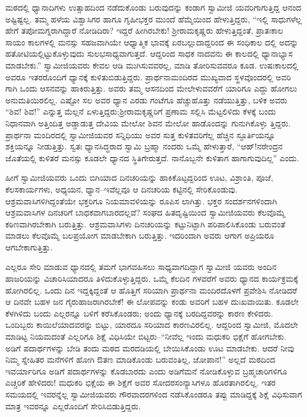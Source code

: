 ಮಠದಲ್ಲಿ ಧ್ಯಾನಾದಿಗಳು ಉತ್ಸಾಹದಿಂದ ನಡೆದುಕೊಂಡು ಬರುವುದನ್ನು ಕಂಡಾಗ ಸ್ವಾಮೀಜಿ ಯವರಿಗಾಗುತ್ತಿದ್ದ ಆನಂದ ಅಷ್ಟಿಷ್ಟಲ್ಲ. ತಮ್ಮ ಹಳೆಯ ವಿಶ್ವಾಸಿಗರ ಹಾಗೂ ಗೃಹೀಭಕ್ತರ ಮುಂದೆ ಹೆಮ್ಮೆಯಿಂದ ಹೇಳುತ್ತಿದ್ದರು, “ಇಲ್ಲಿ ಸಾಧುಗಳೆಲ್ಲ ಹೇಗೆ ತಪೋಮಗ್ನರಾಗಿದ್ದಾರೆ ನೋಡಿದಿರಾ? ಇದ್ದರೆ ಹೀಗಿರಬೇಕು! ಶ್ರೀರಾಮಕೃಷ್ಣರು ಹೇಳುತ್ತಿದ್ದಂತೆ, ಪ್ರಾತಃಕಾಲ ಸಾಯಂ ಕಾಲಗಳಲ್ಲಿ ಮನಸ್ಸು ಸಹಜವಾಗಿಯೇ ಆಧ್ಯಾತ್ಮಿಕ ಭಾವಕ್ಕೆ ಏರಬಲ್ಲುದಾದ್ದರಿಂದ ಈ ಸಂಧಿಕಾಲ ದಲ್ಲಿ ಅದನ್ನು ಹತೋಟಿಯಲ್ಲಿಟ್ಟುಕೊಳ್ಳುವುದು ಸುಲಭಸಾಧ್ಯವಾಗುತ್ತದೆ. ಆದ್ದರಿಂದ ಸಾಧಕ ನಾದವನು ಈ ಕಾಲದಲ್ಲಿ ಧ್ಯಾನಾಭ್ಯಾಸ ಮಾಡಬೇಕು.” ಸ್ವಾಮೀಜಿಯವರು ಕೇವಲ ಆಡಿ ಮುಗಿಸುವವರಲ್ಲ, ಮಾಡಿ ತೋರಿಸುವವರೂ ಕೂಡ. ಉಷಃಕಾಲದಲ್ಲಿ ಅವರೂ ಇತರರೊಂದಿಗೆ ಧ್ಯಾನಕ್ಕೆ ಕುಳಿತುಬಿಡುತ್ತಿದ್ದರು. ಪ್ರಾರ್ಥನಾಮಂದಿರದ ಮುಖ್ಯವಾದ ಸ್ಥಳವೊಂದರಲ್ಲಿ ಅವರಿ ಗಾಗಿ ಒಂದು ಆಸನವನ್ನು ಹಾಕಿರುತ್ತಿತ್ತು. ಅವರು ತಮ್ಮ ಆಸನದಿಂದ ಮೇಲೇಳುವವರೆಗೆ ಯಾರಿಗೂ ಎದ್ದು ಹೋಗಲು ಅನುಮತಿಯಿರಲಿಲ್ಲ. ಎಷ್ಟೋ ಸಲ ಅವರ ಧ್ಯಾನ ಎರಡು ಗಂಟೆಗೂ ಹೆಚ್ಚುಹೊತ್ತು ನಡೆಯುತ್ತಿತ್ತು, ಬಳಿಕ ಅವರು “ಶಿವ! ಶಿವ!” ಎನ್ನುತ್ತ ಮೆಲ್ಲನೆ ಏಳುತ್ತಿದ್ದರು;ಶ್ರೀರಾಮಕೃಷ್ಣರಿಗೆ ಪ್ರಣಾಮ ಸಲ್ಲಿಸಿ ಮೆಟ್ಟಲಿಳಿದು ಕೆಳಕ್ಕೆ ಬಂದು ನಿಧಾನವಾಗಿ ಅತ್ತಿಂದಿತ್ತ ಅಡ್ಡಾಡುತ್ತ ದೇವಿಯ ಮೇಲೋ ಶಿವನ ಮೇಲೋ ಹಾಡೊಂದನ್ನು ಗುನುಗಿಕೊಳ್ಳು ತ್ತಿದ್ದರು. ಪ್ರಾರ್ಥನಾ ಮಂದಿರದಲ್ಲಿ ಸ್ವಾಮೀಜಿಯವರ ಸನ್ನಿಧಿಯು ಅವರ ಸುತ್ತ ಕುಳಿತವರಿಗೆಲ್ಲ ಹೆಚ್ಚಿನ ಸ್ಫೂರ್ತಿಯನ್ನೂ ಶಕ್ತಿಯನ್ನೂ ನೀಡುತ್ತಿತ್ತು. ಸ್ವತಃ ಧ್ಯಾನಸಿದ್ಧರಾದ ಸ್ವಾಮಿ ಬ್ರಹ್ಮಾ ನಂದರು ಒಮ್ಮೆ ಹೇಳುತ್ತಾರೆ, “ಆಹ್!ನರೇಂದ್ರನ ಜೊತೆಯಲ್ಲಿ ಕುಳಿತರೆ ಮನಸ್ಸು ಕೂಡಲೇ ಧ್ಯಾನದ ಸ್ಥಿತಿಗೇರುತ್ತದೆ. ನಾನೊಬ್ಬನೇ ಕುಳಿತಾಗ ಹಾಗಾಗುವುದಿಲ್ಲ” ಎಂದು.

ಹೀಗೆ ಸ್ವಾಮೀಜಿಯವರು ಒಂದು ಬಿಗಿಯಾದ ದಿನಚರಿಯನ್ನು ಹಾಕಿಕೊಟ್ಟದ್ದರಿಂದ ಊಟ, ವಿಶ್ರಾಂತಿ, ಪೂಜೆ, ಕೆಲಸಕಾರ್ಯಗಳು, ಅಧ್ಯಯನ, ಧ್ಯಾನ–ಇವೆಲ್ಲವೂ ಆ ದಿನಚರಿಯ ಕಟ್ಟಿನಲ್ಲಿ ಸೇರಿಕೊಂಡುವು. ಆಶ್ರಮವಾಸಿಗಳಿಗಿದ್ದಂತೆಯೇ ಭಕ್ತರಿಗೂ ನಿಯಮಾವಳಿಯನ್ನು ರೂಪಿಸ ಲಾಗಿತ್ತು. ಭಕ್ತರ ಸಂದರ್ಶನಗಳಿಂದಾಗಿ ಆಶ್ರಮವಾಸಿಗಳ ದಿನಚರಿಗೆ ಬಾಧಕವಾಗಬಾರದಲ್ಲವೆ? ಸಂಘದ ಹಿತದೃಷ್ಟಿಯಿಂದ ಸ್ವಾಮೀಜಿಯವರು ಕೆಲವೊಮ್ಮೆ ಕಠಿಣವಾಗಿರಬೇಕಾಗಿ ಬರುತ್ತಿತ್ತು. ಆಶ್ರಮವಾಸಿಗಳು ದಿನಚರಿಯನ್ನು ಕಟ್ಟುನಿಟ್ಟಾಗಿ ಪರಿಪಾಲಿಸಿಕೊಂಡು ಬರುವಂತೆ ಮಾಡಲು ಕೆಲವೊಮ್ಮೆ ಬಲಪ್ರಯೋಗ ಮಾಡಬೇಕಾಗಿ ಬರುತ್ತಿತ್ತು. ಇದರಿಂದಾಗಿ ಅವರು ಆಗಾಗ ಅಪ್ರಿಯರೂ ಆಗಬೇಕಾಗುತ್ತಿತ್ತು.

ಎಲ್ಲರೂ ಸೇರಿ ಮಾಡುವ ಧ್ಯಾನದಲ್ಲಿ ತಮಗೆ ಭಾಗವಹಿಸಲು ಸಾಧ್ಯವಾಗದಿದ್ದಾಗ ಸ್ವಾಮೀಜಿ ಯವರು ಅಂದಿನ ಹಾಜರಿಯನ್ನು ವಿಚಾರಿಸಿಯಾದರೂ ತಿಳಿದುಕೊಳ್ಳುತ್ತಿದ್ದರು. ಒಮ್ಮೆ ಕೆಲದಿನ ಗಳವರೆಗೆ ಅವರು ಧ್ಯಾನದ ಕಾರ್ಯಕ್ರಮಕ್ಕೆ ಹೋಗಿರಲಿಲ್ಲ. ಒಂದು ದಿನ ಇದ್ದಕ್ಕಿದ್ದಂತೆ ಆ ಹೊತ್ತಿಗೆ ಸರಿಯಾಗಿ ಪ್ರಾರ್ಥನಾ ಮಂದಿರದೊಳಗೆ ಪ್ರವೇಶಿಸಿ ನೋಡಿದರೆ ಆ ದಿನವೇ ಬಹಳ ಜನ ಗೈರುಹಾಜರಾಗಿರಬೇಕೆ! ಈ ಲೋಪವನ್ನು ಕಂಡು ಅವರಿಗೆ ಬಹಳ ದುಃಖವಾಯಿತು. ಕೂಡಲೇ ಕೆಳಗಿಳಿದು ಬಂದು ಎಲ್ಲರನ್ನೂ ಬಳಿಗೆ ಕರೆಸಿಕೊಂಡರು; ಅಂದು ಧ್ಯಾನಕ್ಕೆ ಬರದಿದ್ದವರನ್ನು ಕಾರಣ ಕೇಳಿದರು. ಒಂದಿಬ್ಬರು ಕಾಯಿಲೆಯಾದವರನ್ನು ಬಿಟ್ಟು, ಯಾರದೂ ಸರಿಯಾದ ಕಾರಣವಿರಲಿಲ್ಲ. ಆದ್ದರಿಂದ ಸ್ವಾಮೀಜಿ, ಮೊದಲೇ ಮಾಡಿಟ್ಟ ನಿಯಮದಂತೆ ಎಲ್ಲರಿಗೂ ಶಿಕ್ಷೆ ವಿಧಿಸಿಯೇ ಬಿಟ್ಟರು–“ನೀವೆಲ್ಲ ಇಂದು ಮಧುಕರಿ ಭಿಕ್ಷೆಗೆ ಹೋಗಬೇಕು. ಅಡಿಗೆ ಪದಾರ್ಥಗಳನ್ನು ಬೇಡಿ ತಂದು ಮಠದ ಮರದಡಿಯಲ್ಲಿ ಬೇಯಿಸಿಕೊಂಡು ಊಟ ಮಾಡಬೇಕು. ಆದರೆ ನೀವು ನಿಮ್ಮ ಸ್ನೇಹಿತರ ಮನೆಗಳಿಗೆ ಹೋಗಿ ಔತಣ ಮಾಡಿಕೊಂಡು ಬರುವಂತಿಲ್ಲ, ಜೋಪಾನ!” ಅಲ್ಲದೆ ಮಠದಿಂದ ಇವರ್ಯಾರಿಗೂ ಅಡಿಗೆ ಪದಾರ್ಥಗಳನ್ನು ಕೊಡಬಾರದು ಎಂದು ಅಡಿಗೆಮನೆ ನೋಡಿಕೊಳ್ಳುವ ಬ್ರಹ್ಮಚಾರಿಗಳಿಗೂ ಎಚ್ಚರಿಕೆ ಹೇಳಿದರು! ಮಧುಕರಿ ಭಿಕ್ಷೆಯ ಈ ಶಿಕ್ಷೆಗೆ ಅವರ ಸೋದರಸಂನ್ಯಾಸಿಗಳೂ ಹೊರತಾಗಿರಲಿಲ್ಲ. ಇತರ ಸಮಯದಲ್ಲಿ ಇವರನ್ನೆಲ್ಲ ಸ್ವಾಮೀಜಿಯವರು ಗೌರವಾದರಗಳಿಂದ ನಡೆಸಿಕೊಂಡರೂ ತಪ್ಪು ಮಾಡಿದ್ದಕ್ಕೆ ಶಿಕ್ಷೆ ವಿಧಿಸುವಾಗ ಮಾತ್ರ ಇವರನ್ನೂ ಎಲ್ಲರೊಂದಿಗೆ ಸೇರಿಸಿಬಿಡುತ್ತಿದ್ದರು.

